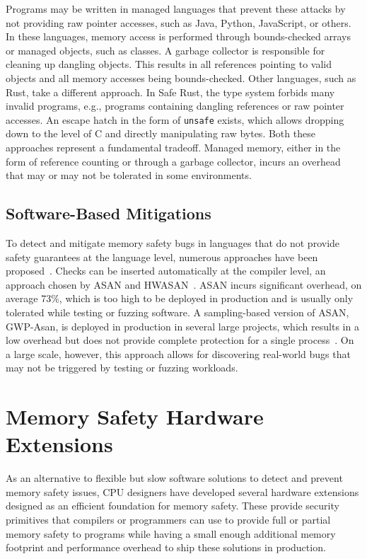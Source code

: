 Programs may be written in managed languages that prevent these attacks by not providing raw pointer accesses, such as Java, Python, JavaScript, or others.
In these languages, memory access is performed through bounds-checked arrays or managed objects, such as classes.
A garbage collector is responsible for cleaning up dangling objects.
This results in all references pointing to valid objects and all memory accesses being bounds-checked.
Other languages, such as Rust, take a different approach.
In Safe Rust, the type system forbids many invalid programs, e.g., programs containing dangling references or raw pointer accesses.
An escape hatch in the form of \texttt{unsafe} exists, which allows dropping down to the level of C and directly manipulating raw bytes.
Both these approaches represent a fundamental tradeoff.
Managed memory, either in the form of reference counting or through a garbage collector, incurs an overhead that may or may not be tolerated in some environments.

\subsection{Software-Based Mitigations}
\label{subsec:software-based-mitigations}

To detect and mitigate memory safety bugs in languages that do not provide safety guarantees at the language level, numerous approaches have been proposed~\cite{serebryany2012addresssanitizer,serebryany2023gwp,nethercote2007valgrind,serebryany2018memory}.
Checks can be inserted automatically at the compiler level, an approach chosen by \ac{ASAN} and \ac{HWASAN}~\cite{serebryany2012addresssanitizer,serebryany2018memory}.
\Ac{ASAN} incurs significant overhead, on average 73\%, which is too high to be deployed in production and is usually only tolerated while testing or fuzzing software.
A sampling-based version of \ac{ASAN}, GWP-Asan, is deployed in production in several large projects, which results in a low overhead but does not provide complete protection for a single process~\cite{serebryany2023gwp}.
On a large scale, however, this approach allows for discovering real-world bugs that may not be triggered by testing or fuzzing workloads.

\section{Memory Safety Hardware Extensions}
\label{sec:memory-safety-hardware-extensions}

As an alternative to flexible but slow software solutions to detect and prevent memory safety issues, CPU designers have developed several hardware extensions designed as an efficient foundation for memory safety.
These provide security primitives that compilers or programmers can use to provide full or partial memory safety to programs while having a small enough additional memory footprint and performance overhead to ship these solutions in production.

